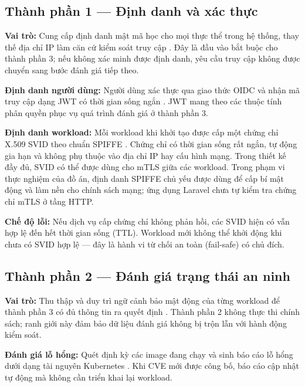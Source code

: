 \subsection{Thành phần 1 — Định danh và xác thực}

\textbf{Vai trò:} Cung cấp định danh mật mã học cho mọi thực thể trong hệ thống, thay thế địa chỉ IP làm căn cứ kiểm soát truy cập \parencite{spiffe_spec,nist800204b_abac_microservices}. Đây là đầu vào bắt buộc cho thành phần 3; nếu không xác minh được định danh, yêu cầu truy cập không được chuyển sang bước đánh giá tiếp theo.

\textbf{Định danh người dùng:} Người dùng xác thực qua giao thức OIDC và nhận mã truy cập dạng JWT có thời gian sống ngắn \parencite{oidc_core,rfc7519_jwt}. JWT mang theo các thuộc tính phân quyền phục vụ quá trình đánh giá ở thành phần 3.

\textbf{Định danh workload:} Mỗi workload khi khởi tạo được cấp một chứng chỉ X.509 SVID theo chuẩn SPIFFE \parencite{spiffe_spec}. Chứng chỉ có thời gian sống rất ngắn, tự động gia hạn và không phụ thuộc vào địa chỉ IP hay cấu hình mạng. Trong thiết kế đầy đủ, SVID có thể được dùng cho mTLS giữa các workload. Trong phạm vi thực nghiệm của đồ án, định danh SPIFFE chủ yếu được dùng để cấp bí mật động và làm nền cho chính sách mạng; ứng dụng Laravel chưa tự kiểm tra chứng chỉ mTLS ở tầng HTTP.

\textbf{Chế độ lỗi:} Nếu dịch vụ cấp chứng chỉ không phản hồi, các SVID hiện có vẫn hợp lệ đến hết thời gian sống (TTL). Workload mới không thể khởi động khi chưa có SVID hợp lệ --- đây là hành vi từ chối an toàn (fail-safe) có chủ đích.


\subsection{Thành phần 2 — Đánh giá trạng thái an ninh}

\textbf{Vai trò:} Thu thập và duy trì ngữ cảnh bảo mật động của từng workload để thành phần 3 có đủ thông tin ra quyết định \parencite{nist800204c_devsecops_microservices,nist800137}. Thành phần 2 không thực thi chính sách; ranh giới này đảm bảo dữ liệu đánh giá không bị trộn lẫn với hành động kiểm soát.

\textbf{Đánh giá lỗ hổng:} Quét định kỳ các image đang chạy và sinh báo cáo lỗ hổng dưới dạng tài nguyên Kubernetes \parencite{trivy_operator}. Khi CVE mới được công bố, báo cáo cập nhật tự động mà không cần triển khai lại workload.

